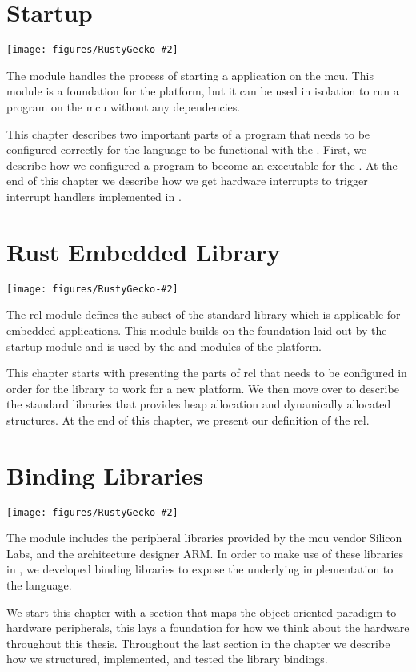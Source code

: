 
\newcommand{\corechapter}[3]{
  \chapter{#1}
  \label{chap:#2}
  \begin{center}
    \texttt{[image: figures/RustyGecko-\#2]}
  \end{center}
  \hfill \break
  \hfill \break
#3
}

\corechapter{Startup}{startup}{%
The  module handles the process of starting a {\rust} application on the \glsdesc{mcu}.
This module is a foundation for the {\rg} platform, but it can be used in isolation to run a program on the \gls{mcu} without any dependencies.

This chapter describes two important parts of a {\rust} program that needs to be configured correctly for the language to be functional with the {\gecko}.
First, we describe how we configured a {\rust} program to become an executable for the {\gecko}.
At the end of this chapter we describe how we get hardware interrupts to trigger interrupt handlers implemented in {\rust}.
}


\corechapter{Rust Embedded Library}{rel}{%
The \glsdesc{rel} module defines the subset of the standard {\rust} library which is applicable for embedded applications.
This module builds on the foundation laid out by the startup module and is used by the \lib{bindings} and \lib{Application Layer} modules of the {\rg} platform.

This chapter starts with presenting the parts of \gls{rcl} that needs to be configured in order for the library to work for a new platform.
We then move over to describe the standard {\rust} libraries that provides heap allocation and dynamically allocated structures.
At the end of this chapter, we present our definition of the \gls{rel}.
}



\corechapter{Binding Libraries}{bindings}{%
The  module includes the peripheral libraries provided by the \gls{mcu} vendor Silicon Labs, and the architecture designer ARM.
In order to make use of these libraries in {\rust}, we developed binding libraries to expose the underlying {\C} implementation to the {\rust} language.

We start this chapter with a section that maps the object-oriented paradigm to hardware peripherals, this lays a foundation for how we think about the hardware throughout this thesis.
Throughout the last section in the chapter we describe how we structured, implemented, and tested the library bindings.
}




